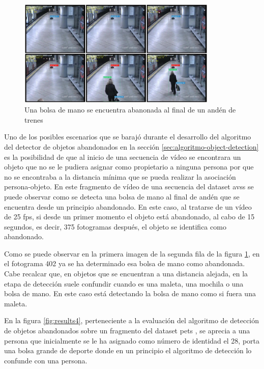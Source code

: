 \begin{figure}[ht]
\centering
\includegraphics[width=0.85\textwidth]{img/chapters/resultados/abandono/3.png}
\caption{\label{fig:results3}Una bolsa de mano se encuentra abanonada al final de un andén de trenes \cite{AVSSAB2007-dataset}}
\end{figure}

Uno de los posibles escenarios que se barajó durante el desarrollo del algoritmo del detector de objetos abandonados en la sección \ref{sec:algoritmo-object-detection} es la posibilidad de que al inicio de una secuencia de vídeo se encontrara un objeto que no se le pudiera asignar como propietario a ninguna persona por que no se encontraba a la distancia mínima que se pueda realizar la asociación persona-objeto. En este fragmento de vídeo de una secuencia del dataset \gls{avss} \cite{AVSSAB2007-dataset} se puede observar como se detecta una bolsa de mano al final de andén que se encuentra desde un principio abandonado. En este caso, al tratarse de un vídeo de 25 \gls{fps}, si desde un primer momento el objeto está abandonado, al cabo de 15 segundos, es decir, 375 fotogramas después, el objeto se identifica como abandonado.

Como se puede observar en la primera imagen de la segunda fila de la figura \ref{fig:results3}, en el fotograma 402 ya se ha determinado esa bolsa de mano como abandonada. Cabe recalcar que, en objetos que se encuentran a una distancia alejada, en la etapa de detección suele confundir cuando es una maleta, una mochila o una bolsa de mano. En este caso está detectando la bolsa de mano como si fuera una maleta. 

En la figura \ref{fig:results4}, perteneciente a la evaluación del algoritmo de detección de objetos abandonados sobre un fragmento del dataset \gls{pets} \cite{pets2007-dataset}, se aprecia a una persona que inicialmente se le ha asignado como número de identidad el 28, porta una bolsa grande de deporte donde en un principio el algoritmo de detección lo confunde con una persona.

